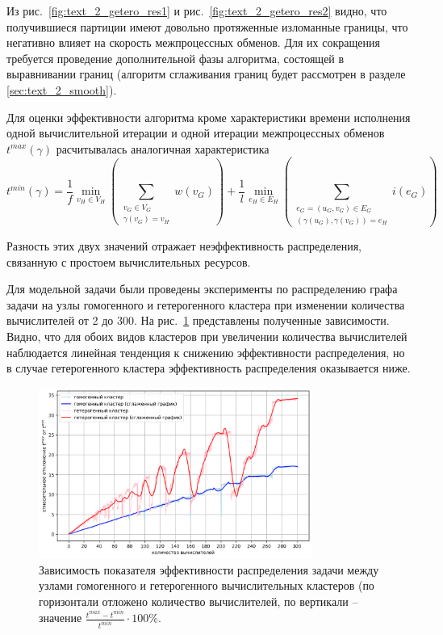 Из рис.~\ref{fig:text_2_getero_res1} и рис.~\ref{fig:text_2_getero_res2} видно, что получившиеся партиции имеют довольно протяженные изломанные границы, что негативно влияет на скорость межпроцессных обменов.
Для их сокращения требуется проведение дополнительной фазы алгоритма, состоящей в выравнивании границ (алгоритм сглаживания границ будет рассмотрен в разделе \ref{sec:text_2_smooth}).

Для оценки эффективности алгоритма кроме характеристики времени исполнения одной вычислительной итерации и одной итерации межпроцессных обменов $t^{max}(\gamma)$ расчитывалась аналогичная характеристика
\begin{equation}
	t^{min}(\gamma) =
		\frac{1}{f} \min_{v_H \in V_H}{\left( \sum_{\substack{v_G \in V_G \\ \gamma(v_G) = v_H}}{w(v_G)} \right)} + 
		\frac{1}{l} \min_{e_H \in E_H}{\left( \sum_{\substack{e_G = (u_G, v_G) \in E_G \\ (\gamma(u_G), \gamma(v_G)) = e_H}}{i(e_G)} \right)}
\end{equation}

Разность этих двух значений отражает неэффективность распределения, связанную с простоем вычислительных ресурсов.

Для модельной задачи были проведены эксперименты по распределению графа задачи на узлы гомогенного и гетерогенного кластера при изменении количества вычислителей от 2 до 300.
На рис.~\ref{fig:text_2_getero_chart} представлены полученные зависимости.
Видно, что для обоих видов кластеров при увеличении количества вычислителей наблюдается линейная тенденция к снижению эффективности распределения, но в случае гетерогенного кластера эффективность распределения оказывается ниже.

\begin{figure}[H]
\centering
\includegraphics[width=0.8\textwidth]{./pics/text_2_getero/chart2.png}
\singlespacing
{}\caption{Зависимость показателя эффективности распределения задачи между узлами гомогенного и гетерогенного вычислительных кластеров (по горизонтали отложено количество вычислителей, по вертикали -- значение $\frac{t^{max} - t^{min}}{t^{min}} \cdot 100\%$.}
\label{fig:text_2_getero_chart}
\end{figure}

